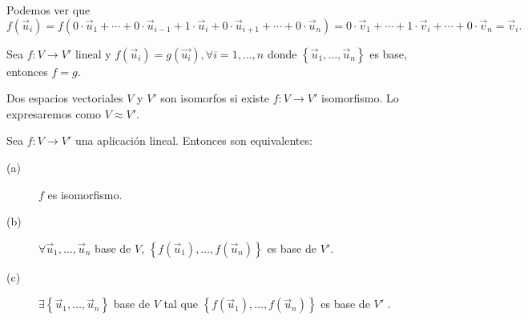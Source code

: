 Podemos ver que
\[f\left(\vec{u}_{i}\right) = f\left(0 \cdot \vec{u}_{1} + \cdots + 0 \cdot \vec{u}_{i-1} + 1 \cdot \vec{u}_{i} + 0 \cdot \vec{u}_{i+1} + \cdots + 0 \cdot \vec{u}_{n}\right) = 0 \cdot \vec{v}_{1} + \cdots + 1 \cdot \vec{v}_{i} + \cdots + 0 \cdot \vec{v}_{n} = \vec{v}_{i} .\]

\begin{fcolorary}[]
	\normalfont Sea $\displaystyle f: V \to V' $ lineal y $\displaystyle f\left(\vec{u}_{i}\right) = g\left(\vec{u_{i}}\right), \forall i = 1, \ldots, n $ donde $\displaystyle \left\{ \vec{u}_{1}, \ldots, \vec{u}_{n}\right\}  $ es base, entonces $\displaystyle f = g $.
\end{fcolorary}

\begin{fdefinition}[]
\normalfont Dos espacios vectoriales $\displaystyle V $ y $\displaystyle V' $ son isomorfos si existe $\displaystyle f: V \to V' $ isomorfismo. Lo expresaremos como $\displaystyle V \approx V' $.
\end{fdefinition}

\begin{ftheorem}[]
\normalfont Sea $\displaystyle f: V \to V' $ una aplicación lineal. Entonces son equivalentes:
\begin{description}
\item[(a)] $\displaystyle f $ es isomorfismo.
\item[(b)] $\displaystyle \forall \vec{u}_{1}, \ldots, \vec{u}_{n} $ base de $\displaystyle V $, $\displaystyle \left\{ f\left(\vec{u}_{1}\right), \ldots, f\left(\vec{u}_{n}\right)\right\}  $ es base de $\displaystyle V' $.
\item[(c)] $\displaystyle \exists \left\{ \vec{u}_{1}, \ldots, \vec{u}_{n}\right\}  $ base de $\displaystyle V $ tal que $\displaystyle \left\{ f\left(\vec{u}_{1}\right), \ldots, f\left(\vec{u}_{n}\right)\right\}  $ es base de $\displaystyle V' $ .
\end{description}
\end{ftheorem}

